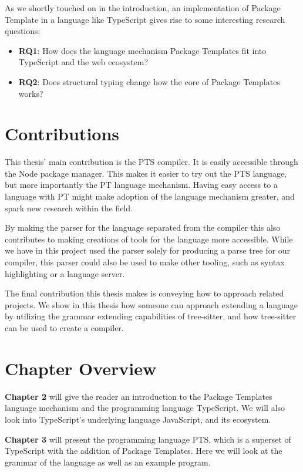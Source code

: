 As we shortly touched on in the introduction, an implementation of Package Template in a language like TypeScript gives rise to some interesting research questions:

\begin{itemize}
    \item \textbf{RQ1}: How does the language mechanism Package Templates fit into TypeScript and the web ecosystem?
    \item \textbf{RQ2}: Does structural typing change how the core of Package Templates works?
\end{itemize}

\section{Contributions}\label{sec:contributions}

This thesis' main contribution is the PTS compiler.
It is easily accessible through the Node package manager.
This makes it easier to try out the PTS language, but more importantly the PT language mechanism.
Having easy access to a language with PT might make adoption of the language mechanism greater, and spark new research within the field.

By making the parser for the language separated from the compiler this also contributes to making creations of tools for the language more accessible.
While we have in this project used the parser solely for producing a parse tree for our compiler, this parser could also be used to make other tooling, such as syntax highlighting or a language server.

The final contribution this thesis makes is conveying how to approach related projects.
We show in this thesis how someone can approach extending a language by utilizing the grammar extending capabilities of tree-sitter, and how tree-sitter can be used to create a compiler.

\section{Chapter Overview}\label{sec:chapter-overview}


\textbf{Chapter 2} will give the reader an introduction to the Package Templates language mechanism and the programming language TypeScript.
We will also look into TypeScript's underlying language JavaScript, and its ecosystem.

\textbf{Chapter 3} will present the programming language PTS, which is a superset of TypeScript with the addition of Package Templates.
Here we will look at the grammar of the language as well as an example program.

